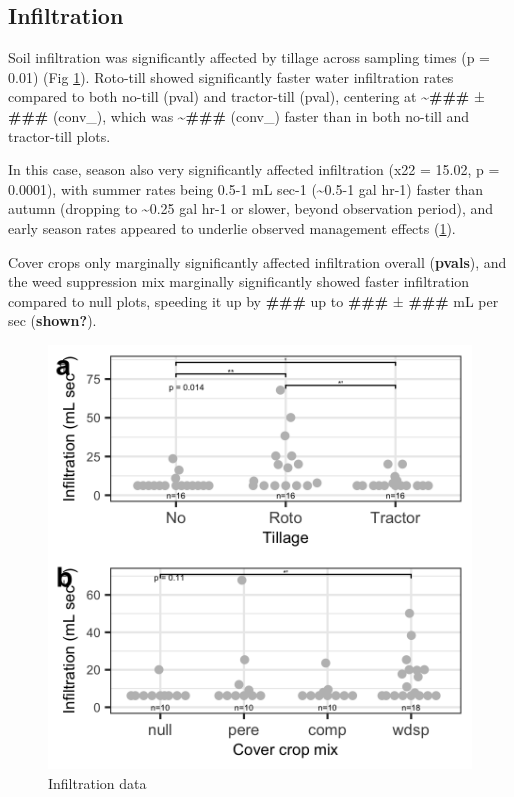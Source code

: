 \documentclass[
]{article}
\begin{document}
\hypertarget{infiltration-1}{%
\subsection{Infiltration}\label{infiltration-1}}

Soil infiltration was significantly affected by tillage across sampling times (p = 0.01) (Fig \ref{fig:infilFig}).
Roto-till showed significantly faster water infiltration rates compared to both no-till (pval) and tractor-till (pval), centering at \textasciitilde{}\textbf{\#\#\#} ± \textbf{\#\#\#} (conv\_), which was \textasciitilde{}\textbf{\#\#\#} (conv\_) faster than in both no-till and tractor-till plots.

In this case, season also very significantly affected infiltration (x22 = 15.02, p = 0.0001), with summer rates being 0.5-1 mL sec-1 (\textasciitilde0.5-1 gal hr-1) faster than autumn (dropping to \textasciitilde0.25 gal hr-1 or slower, beyond observation period), and early season rates appeared to underlie observed management effects (\ref{fig:infilFig}).

Cover crops only marginally significantly affected infiltration overall (\textbf{pvals}), and the weed suppression mix marginally significantly showed faster infiltration compared to null plots, speeding it up by \textbf{\#\#\#} up to \textbf{\#\#\#} ± \textbf{\#\#\#} mL per sec (\textbf{shown?}).

\begin{figure}
\includegraphics[width=12.5in]{../figs/infilPlot} \caption{Infiltration data}\label{fig:infilFig}
\end{figure}
\end{document}
